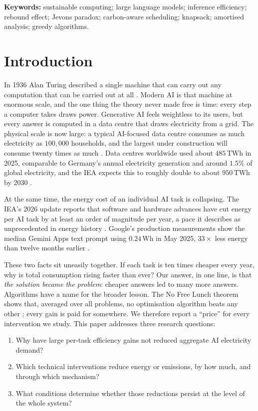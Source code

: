 \documentclass[11pt]{article}
\theoremstyle{definition}
\theoremstyle{remark}
\newcommand{\Wh}{\,\mathrm{Wh}}
\newcommand{\TWh}{\,\mathrm{TWh}}
\begin{document}
\noindent\textbf{Keywords:} sustainable computing; large language models; inference efficiency; rebound effect; Jevons paradox; carbon-aware scheduling; knapsack; amortised analysis; greedy algorithms.
\section{Introduction}\label{sec:intro}

In 1936 Alan Turing described a single machine that can carry out any computation that can be carried out at all \citep{turing1936}. Modern AI is that machine at enormous scale, and the one thing the theory never made free is time: every step a computer takes draws power. Generative AI feels weightless to its users, but every answer is computed in a data centre that draws electricity from a grid. The physical scale is now large: a typical AI-focused data centre consumes as much electricity as $100{,}000$ households, and the largest under construction will consume twenty times as much \citep{iea2025}. Data centres worldwide used about $485\TWh$ in 2025, comparable to Germany's annual electricity generation and around $1.5\%$ of global electricity, and the IEA expects this to roughly double to about $950\TWh$ by 2030 \citep{iea2026,owid2026}.

At the same time, the energy cost of an individual AI task is collapsing. The IEA's 2026 update reports that software and hardware advances have cut energy per AI task by at least an order of magnitude per year, a pace it describes as unprecedented in energy history \citep{iea2026}. Google's production measurements show the median Gemini Apps text prompt using $0.24\Wh$ in May 2025, $33\times$ less energy than twelve months earlier \citep{elsworth2025}.

These two facts sit uneasily together. If each task is ten times cheaper every year, why is total consumption rising faster than ever? Our answer, in one line, is that \emph{the solution became the problem}: cheaper answers led to many more answers. Algorithms have a name for the broader lesson. The No Free Lunch theorem shows that, averaged over all problems, no optimisation algorithm beats any other \citep{wolpert1997}; every gain is paid for somewhere. We therefore report a ``price'' for every intervention we study. This paper addresses three research questions:
\begin{enumerate}[label=\textbf{RQ\arabic*.},leftmargin=*,itemsep=1pt]
  \item Why have large per-task efficiency gains not reduced aggregate AI electricity demand?
  \item Which technical interventions reduce energy or emissions, by how much, and through which mechanism?
  \item What conditions determine whether those reductions persist at the level of the whole system?
\end{enumerate}
\end{document}
